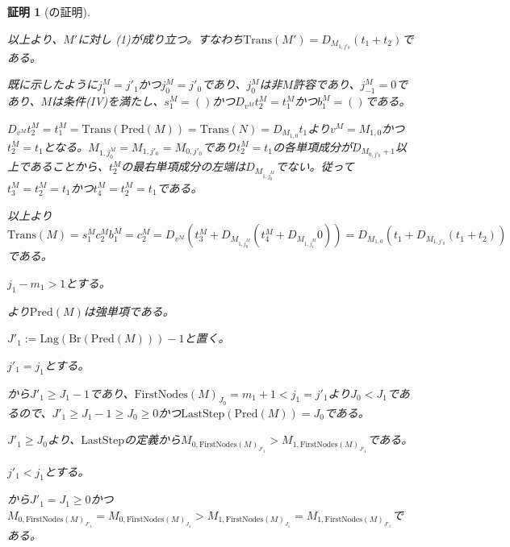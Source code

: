 \documentclass[dvipdfmx,uplatex]{jsarticle}
\theoremstyle{customnonumberbreakfortheorem}
\theoremstyle{customnonumberbreakforproof}
\newtheorem{hideableproof}{証明}
\begin{document}
\begin{hideableproof}[の証明]
\begin{indented}
\begin{indented}
			\item 以上より、\(M'\)に対し (1)が成り立つ。すなわち\(\textrm{Trans}(M') = D_{M_{1,j'_0}}(t_1 + t_2)\)である。
			\item 既に示したように\(j_1^M = j'_1\)かつ\(j_0^M = j'_0\)であり、\(j_0^M\)は非\(M\)許容であり、\(j_{-1}^M = 0\)であり、\(M\)は条件(IV)を満たし、\(s_1^M = ()\)かつ\(D_{v^M} t_2^M = t_1^M\)かつ\(b_1^M = ()\)である。
			\item \(D_{v^M} t_2^M = t_1^M = \textrm{Trans}(\textrm{Pred}(M)) = \textrm{Trans}(N) = D_{M_{1,0}} t_1\)より\(v^M = M_{1,0}\)かつ\(t_2^M = t_1\)となる。\(M_{1,j_0^M} = M_{1,j'_0} = M_{0,j'_0}\)であり\(t_2^M = t_1\)の各単項成分が\(D_{M_{0,j'_0}+1}\)以上であることから、\(t_2^M\)の最右単項成分の左端は\(D_{M_{1,j_0^M}}\)でない。従って\(t_3^M = t_2^M = t_1\)かつ\(t_4^M = t_2^M = t_1\)である。
			\item 以上より\(\textrm{Trans}(M) = s_1^M c_2^M b_1^M = c_2^M = D_{v^M}(t_3^M + D_{M_{1,j_0^M}}(t_4^M + D_{M_{1,j_1^M}} 0)) = D_{M_{1,0}}(t_1 + D_{M_{1,j'_0}}(t_1 + t_2))\)である。
		\end{indented}
		\item
		\item \(j_1-m_1 > 1\)とする。
		\begin{indented}
			\item {}より\(\textrm{Pred}(M)\)は強単項である。
			\item \(J'_1 := \textrm{Lng}(\textrm{Br}(\textrm{Pred}(M)))-1\)と置く。
			\item
			\item \(j'_1 = j_1\)とする。
			\begin{indented}
				\item {}から\(J'_1 \geq J_1-1\)であり、\(\textrm{FirstNodes}(M)_{J_0} = m_1+1 < j_1 = j'_1\)より\(J_0 < J_1\)であるので、\(J'_1 \geq J_1-1 \geq J_0 \geq 0\)かつ\(\textrm{LastStep}(\textrm{Pred}(M)) = J_0\)である。
				\item \(J'_1 \geq J_0\)より、\(\textrm{LastStep}\)の定義から\(M_{0,\textrm{FirstNodes}(M)_{J'_1}} > M_{1,\textrm{FirstNodes}(M)_{J'_1}}\)である。
			\end{indented}
			\item
			\item \(j'_1 < j_1\)とする。
			\begin{indented}
				\item {}から\(J'_1 = J_1 \geq 0\)かつ\(M_{0,\textrm{FirstNodes}(M)_{J'_1}} = M_{0,\textrm{FirstNodes}(M)_{J_1}} > M_{1,\textrm{FirstNodes}(M)_{J_1}} = M_{1,\textrm{FirstNodes}(M)_{J'_1}}\)である。

\end{indented}
\end{indented}
\end{indented}
\end{hideableproof}
\end{document}
